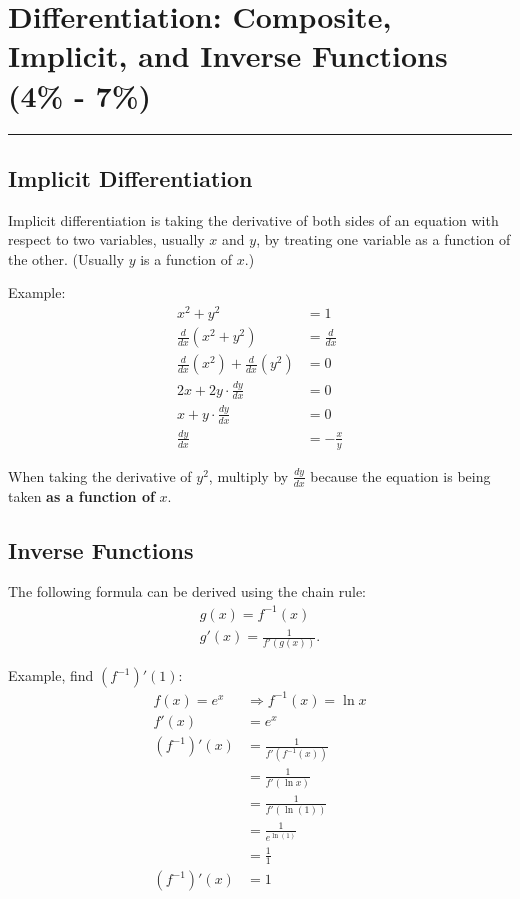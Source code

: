 \documentclass[12pt]{article}
\newcommand{\fline}{\par\noindent\rule{\textwidth}{0.1pt}} %
\begin{document}
    \section{Differentiation: Composite, Implicit, and Inverse Functions (4\% - 7\%)}
    \fline
        \subsection{Implicit Differentiation}
            Implicit differentiation is taking the derivative of both sides of an equation with respect to two variables, usually $x$ and $y$, by treating one variable as a function of the other. (Usually $y$ is a function of $x$.)

            \noindent Example:
            \begin{align*}
                x^2 + y^2 &= 1 \\
                \frac{d}{dx} \left( x^2 + y^2 \right) &= \frac{d}{dx} \\[6pt]
                \frac{d}{dx} \left( x^2 \right) + \frac{d}{dx} \left( y^2 \right) &= 0 \\[6pt]
                2x + 2y \cdot \frac{dy}{dx} &= 0 \\[6pt]
                x + y \cdot \frac{dy}{dx} &= 0 \\[6pt]
                \frac{dy}{dx} &= -\frac{x}{y}
            \end{align*}

            When taking the derivative of $y^2$, multiply by $\frac{dy}{dx}$ because the equation is being taken \textbf{as a function of} $x$.

        \subsection{Inverse Functions}
            \noindent The following formula can be derived using the chain rule:
            \begin{gather*}
                g(x) = f^{-1}(x) \\
                g'(x) = \frac{1}{f'\left( g(x) \right)}.
            \end{gather*}

            \noindent Example, find $(f^{-1})'(1)$:
            \begin{align*}
                f(x) = e^x &\Rightarrow f^{-1}(x) = \ln{x} \\
                f'(x) &= e^x \\
                (f^{-1})'(x) &= \frac{1}{f' \left( f^{-1}(x) \right)} \\[6pt]
                &= \frac{1}{f'(\ln{x})} \\[6pt]
                &= \frac{1}{f'(\ln{(1)})} \\[6pt]
                &= \frac{1}{e^{\ln{(1)}}} \\[6pt]
                &= \frac{1}{1} \\[6pt]
                (f^{-1})'(x) &= 1
            \end{align*}
\end{document}
